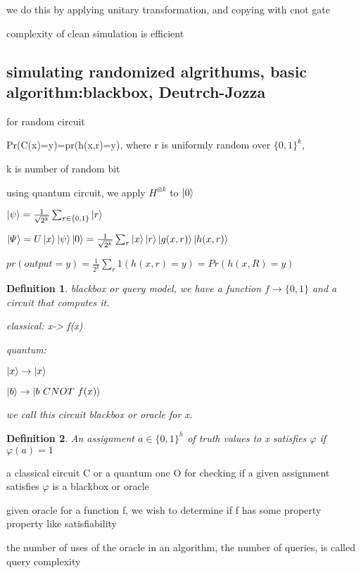 \documentclass[10pt]{article}
\theoremstyle{break}
\newtheorem{defn}{Definition}[subsection]
\begin{document}
        we do this by applying unitary transformation, and copying with cnot gate 

        complexity of clean simulation is efficient

    \subsection{simulating randomized algrithums, basic algorithm:blackbox, Deutrch-Jozza}
         for random circuit 

         Pr(C(x)=y)=pr(h(x,r)=y), where r is uniformly random over $\{0,1\}^k$,

        k is number of random bit 

        using quantum circuit, we apply $H^{\otimes k}$ to $\ket{0}$

        $\ket{\psi}=\frac{1}{\sqrt{2^k}}\sum_{r\in\{0,1\}}\ket{r}$

        $\ket{\varPsi}=U\ket{x}\ket{\psi}\ket{0}=\frac{1}{\sqrt{2^k}}
        \sum_r\ket{x}\ket{r}\ket{g(x,r)}\ket{h(x,r)}$

        $pr(output = y)=\frac{1}{2^k}\sum_r 1 (h(x,r)=y)=Pr(h(x,R)=y)$
         
        \begin{defn}
            blackbox or query model, we have a function $f \rightarrow \{0,1\}$
            and a circuit that computes it.

            classical: x-> f(x)

            quantum: 

            $\ket{x}\rightarrow \ket{x}$

            $\ket{b}\rightarrow \ket{b\ CNOT\ f(x)}$


            we call this circuit blackbox or oracle for x.
        \end{defn}


        \begin{defn}
            An assignment $a\in\{0,1\}^h$ of truth values to x satisfies 
            $\varphi$ if $\varphi(a)=1$
        \end{defn}

        a classical circuit C or a quantum one O for checking if a given assignment 
        satisfies $\varphi$ is a blackbox or oracle 

        given oracle for a function f, we wish to determine if f has some property 
        property like satisfiability

        the number of uses of the oracle in an algorithm, the number of queries,
         is called query complexity 
\end{document}
